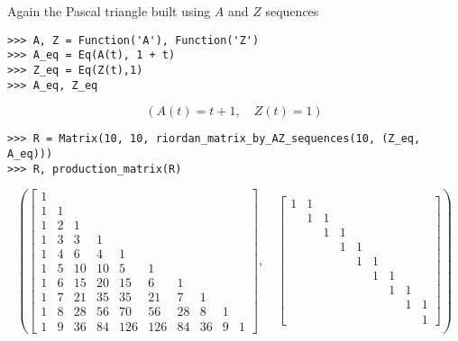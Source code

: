 \begin{example}
Again the Pascal triangle built using $A$ and $Z$ sequences
\begin{verbatim}
>>> A, Z = Function('A'), Function('Z')
>>> A_eq = Eq(A(t), 1 + t)
>>> Z_eq = Eq(Z(t),1)
>>> A_eq, Z_eq
\end{verbatim}
\begin{displaymath}
\left ( A{\left (t \right )} = t + 1, \quad Z{\left (t \right )} = 1\right )
\end{displaymath}
\begin{verbatim}
>>> R = Matrix(10, 10, riordan_matrix_by_AZ_sequences(10, (Z_eq, A_eq)))
>>> R, production_matrix(R)
\end{verbatim}
\begin{displaymath}
\left ( \left[\begin{matrix}1 &   &   &   &   &   &   &   &   &  \\1 & 1 &   &   &   &   &   &   &   &  \\1 & 2 & 1 &   &   &   &   &   &   &  \\1 & 3 & 3 & 1 &   &   &   &   &   &  \\1 & 4 & 6 & 4 & 1 &   &   &   &   &  \\1 & 5 & 10 & 10 & 5 & 1 &   &   &   &  \\1 & 6 & 15 & 20 & 15 & 6 & 1 &   &   &  \\1 & 7 & 21 & 35 & 35 & 21 & 7 & 1 &   &  \\1 & 8 & 28 & 56 & 70 & 56 & 28 & 8 & 1 &  \\1 & 9 & 36 & 84 & 126 & 126 & 84 & 36 & 9 & 1\end{matrix}\right], \quad \left[\begin{matrix}1 & 1 &   &   &   &   &   &   &  \\  & 1 & 1 &   &   &   &   &   &  \\  &   & 1 & 1 &   &   &   &   &  \\  &   &   & 1 & 1 &   &   &   &  \\  &   &   &   & 1 & 1 &   &   &  \\  &   &   &   &   & 1 & 1 &   &  \\  &   &   &   &   &   & 1 & 1 &  \\  &   &   &   &   &   &   & 1 & 1\\  &   &   &   &   &   &   &   & 1\end{matrix}\right]\right )
\end{displaymath}
\end{example}


